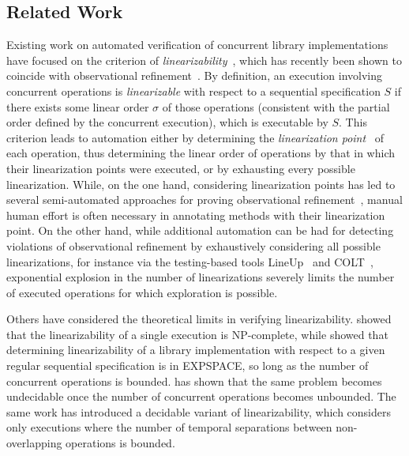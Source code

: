 \subsection{Related Work}
\label{sec:related}

Existing work on automated verification of concurrent library implementations
have focused on the criterion of
\emph{linearizability}~\citep{journals/toplas/HerlihyW90}, which has recently
been shown to coincide with observational
refinement~\citep{journals/tcs/FilipovicORY10}. By definition, an execution
involving concurrent operations is \emph{linearizable} with respect to a
sequential specification $S$ if there exists some linear order $\sigma$ of
those operations (consistent with the partial order defined by the concurrent execution), 
which is executable by $S$. This criterion leads to automation
either by determining the \emph{linearization
point}~\citep{journals/toplas/HerlihyW90} of each operation, thus determining
the linear order of operations by that in which their linearization points were
executed, or by exhausting every possible linearization. While, on the one
hand, considering linearization points has led to several semi-automated
approaches for proving observational refinement~\citep{DBLP:conf/cav/AmitRRSY07,conf/fm/LiuCLS09, conf/podc/OHearnRVYY10,
conf/cav/Vafeiadis10, conf/icse/Zhang11a, conf/pldi/LiangF13,
conf/cav/DragoiGH13}, manual human effort is often necessary in annotating
methods with their linearization point. On the other hand, while additional
automation can be had for detecting violations of observational refinement 
by exhaustively considering all possible linearizations,
for instance via the testing-based tools LineUp~\citep{conf/pldi/BurckhardtDMT10} and COLT~\citep{DBLP:conf/oopsla/ShachamBASVY11}, exponential
explosion in the number of linearizations severely limits the number of
executed operations for which exploration is possible.

Others have considered the theoretical limits in verifying linearizability.
\citet{journals/siamcomp/GibbonsK97} showed that the linearizability of a
single execution is NP-complete, while \citet{journals/iandc/AlurMP00} showed
that determining linearizability of a library implementation with respect to a
given regular sequential specification is in EXPSPACE, so long as the number of
concurrent operations is bounded. \citet{conf/esop/BouajjaniEEH13} has shown that the same
problem becomes undecidable once the number of concurrent operations becomes
unbounded. The same work has introduced a decidable variant of linearizability, which
considers only executions where the number of temporal separations between non-overlapping 
operations is bounded.
%
